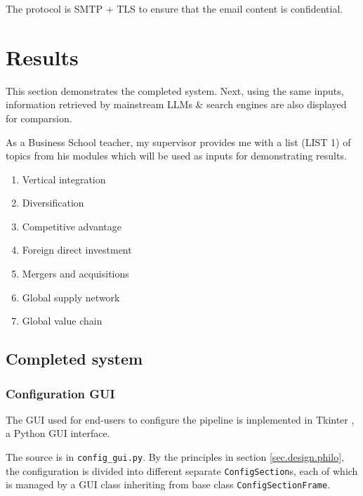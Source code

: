 \documentclass[final-report]{report-template}
\newcommand\ttb{\discretionary{}{}{}}
\begin{document}
The protocol is SMTP + TLS to ensure that the email content is confidential.


\section{Results}
This section demonstrates the completed system.  Next, using the same inputs,
information retrieved by mainstream LLMs \& search engines are also displayed
for comparsion.

As a Business School teacher, my supervisor provides me with a list (LIST 1) of
topics from his modules which will be used as inputs for demonstrating results.
\begin{enumerate}
	\item Vertical integration
	\item Diversification 
	\item Competitive advantage
	\item Foreign direct investment
	\item Mergers and acquisitions
	\item Global supply network
	\item Global value chain
\end{enumerate}

\subsection{Completed system}
\subsubsection{Configuration GUI}
The GUI used for end-users to configure the pipeline is implemented in Tkinter
\cite{tkinter}, a Python GUI interface. 

The source is in \verb!config_gui.py!. By the principles in section
\ref{sec.design.philo}, the configuration is divided into different separate
\texttt{Config\ttb Section}s, each of which is managed by a GUI class
inheriting from base class \texttt{Config\ttb Section\ttb Frame}.
\end{document}
